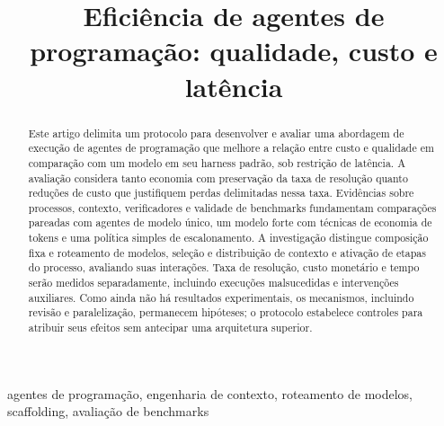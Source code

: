 \documentclass[conference]{IEEEtran}
\title{Eficiência de agentes de programação: qualidade, custo e latência}
\author{\IEEEauthorblockN{Isaac}}
\begin{document}
\maketitle

\begin{abstract}
Este artigo delimita um protocolo para desenvolver e avaliar uma abordagem de execução de agentes de programação que melhore a relação entre custo e qualidade em comparação com um modelo em seu harness padrão, sob restrição de latência. A avaliação considera tanto economia com preservação da taxa de resolução quanto reduções de custo que justifiquem perdas delimitadas nessa taxa. Evidências sobre processos, contexto, verificadores e validade de benchmarks fundamentam comparações pareadas com agentes de modelo único, um modelo forte com técnicas de economia de tokens e uma política simples de escalonamento. A investigação distingue composição fixa e roteamento de modelos, seleção e distribuição de contexto e ativação de etapas do processo, avaliando suas interações. Taxa de resolução, custo monetário e tempo serão medidos separadamente, incluindo execuções malsucedidas e intervenções auxiliares. Como ainda não há resultados experimentais, os mecanismos, incluindo revisão e paralelização, permanecem hipóteses; o protocolo estabelece controles para atribuir seus efeitos sem antecipar uma arquitetura superior.
\end{abstract}

\begin{IEEEkeywords}
agentes de programação, engenharia de contexto, roteamento de modelos, scaffolding, avaliação de benchmarks
\end{IEEEkeywords}









\end{document}

